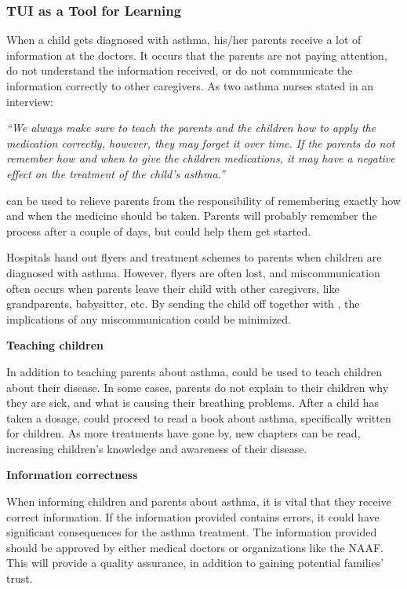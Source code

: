 \subsubsection{TUI as a Tool for Learning}
\label{sec:tuiasatoolforlearning}

When a child gets diagnosed with asthma, his/her parents receive a lot of information at the doctors. It occurs that the parents are not paying attention, do not understand the information received, or do not communicate the information correctly to other caregivers. As two asthma nurses stated in an interview: 

\textit{``We always make sure to teach the parents and the children how to apply the medication correctly, however, they may forget it over time. If the parents do not remember how and when to give the children medications, it may have a negative effect on the treatment of the child's asthma.''}

\buddy{} can be used to relieve parents from the responsibility of remembering exactly how and when the medicine should be taken. Parents will probably remember the process after a couple of days, but \buddy{} could help them get started. 

Hospitals hand out flyers and treatment schemes to parents when children are diagnosed with asthma. However, flyers are often lost, and miscommunication often occurs when parents leave their child with other caregivers, like grandparents, babysitter, etc. By sending the child off together with \buddy{}, the implications of any miscommunication could be minimized.    

\textbf{Teaching children}

In addition to teaching parents about asthma, \buddy{} could be used to teach children about their disease. In some cases, parents do not explain to their children why they are sick, and what is causing their breathing problems. After a child has taken a dosage, \buddy{} could proceed to read a book about asthma, specifically written for children. As more treatments have gone by, new chapters can be read, increasing children's knowledge and awareness of their disease.   

\textbf{Information correctness}

When informing children and parents about asthma, it is vital that they receive correct information. If the information provided contains errors, it could have significant consequences for the asthma treatment. The information provided should be approved by either medical doctors or organizations like the NAAF. This will provide a quality assurance, in addition to gaining potential families' trust.    

